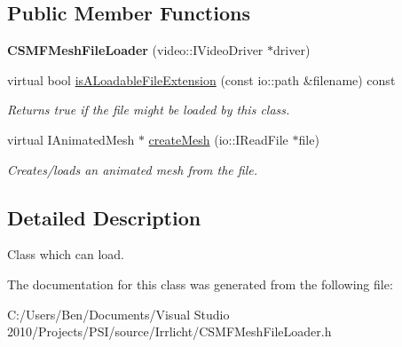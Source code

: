 \subsection*{Public Member Functions}
\begin{DoxyCompactItemize}
\item 
\hypertarget{classirr_1_1scene_1_1_c_s_m_f_mesh_file_loader_ae128f6562f1df6ab31dbd57d8b37a561}{{\bfseries C\-S\-M\-F\-Mesh\-File\-Loader} (video\-::\-I\-Video\-Driver $\ast$driver)}\label{classirr_1_1scene_1_1_c_s_m_f_mesh_file_loader_ae128f6562f1df6ab31dbd57d8b37a561}

\item 
\hypertarget{classirr_1_1scene_1_1_c_s_m_f_mesh_file_loader_a3d5aff65d22deadebd355c541448b78a}{virtual bool \hyperlink{classirr_1_1scene_1_1_c_s_m_f_mesh_file_loader_a3d5aff65d22deadebd355c541448b78a}{is\-A\-Loadable\-File\-Extension} (const io\-::path \&filename) const }\label{classirr_1_1scene_1_1_c_s_m_f_mesh_file_loader_a3d5aff65d22deadebd355c541448b78a}

\begin{DoxyCompactList}\small\item\em Returns true if the file might be loaded by this class. \end{DoxyCompactList}\item 
\hypertarget{classirr_1_1scene_1_1_c_s_m_f_mesh_file_loader_adcd51867c293e4b6b22651241d126297}{virtual I\-Animated\-Mesh $\ast$ \hyperlink{classirr_1_1scene_1_1_c_s_m_f_mesh_file_loader_adcd51867c293e4b6b22651241d126297}{create\-Mesh} (io\-::\-I\-Read\-File $\ast$file)}\label{classirr_1_1scene_1_1_c_s_m_f_mesh_file_loader_adcd51867c293e4b6b22651241d126297}

\begin{DoxyCompactList}\small\item\em Creates/loads an animated mesh from the file. \end{DoxyCompactList}\end{DoxyCompactItemize}


\subsection{Detailed Description}
Class which can load. 

The documentation for this class was generated from the following file\-:\begin{DoxyCompactItemize}
\item 
C\-:/\-Users/\-Ben/\-Documents/\-Visual Studio 2010/\-Projects/\-P\-S\-I/source/\-Irrlicht/C\-S\-M\-F\-Mesh\-File\-Loader.\-h\end{DoxyCompactItemize}
